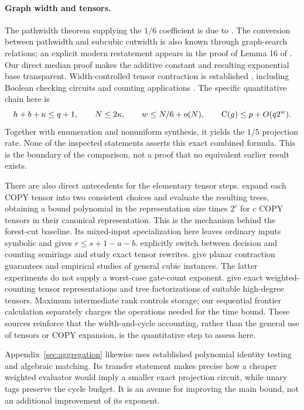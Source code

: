 \paragraph{Graph width and tensors.}
The pathwidth theorem supplying the $1/6$ coefficient is due to
\citet{FominHoie2006}. The conversion between pathwidth and subcubic
cutwidth is also known through graph-search relations; an explicit
modern restatement appears in the proof of Lemma 16 of
\citet{Bodlaender2025}. Our direct median proof makes the additive
constant and resulting exponential base transparent.
Width-controlled tensor contraction is established
\citep{MarkovShi2008}, including Boolean checking circuits and
counting applications \citep{Johnson2013}. The specific quantitative
chain here is
\[
 h+b+\kappa\le q+1,
 \qquad N\le2\kappa,
 \qquad w\le N/6+o(N),
 \qquad \mathrm{C}(g)\le p+O(q2^w).
\]
Together with enumeration and nonuniform synthesis, it yields the
$1/5$ projection rate. None of the inspected statements asserts this
exact combined formula. This is the boundary of the comparison, not
a proof that no equivalent earlier result exists.

There are also direct antecedents for the elementary tensor steps.
\citet{BiamonteMortonTurner2015} expand each COPY tensor into two
consistent choices and evaluate the resulting trees, obtaining a
bound polynomial in the representation size times $2^c$ for $c$
COPY tensors in their canonical representation. This is the mechanism
behind the forest-cut baseline. Its mixed-input specialization here
leaves ordinary inputs symbolic and gives $r\le s+1-a-b$.
\citet{BeaudrapKissingerMeichanetzidis2021} explicitly switch between
decision and counting semirings and study exact tensor rewrites.
\citet{Kourtis2019} give planar contraction guarantees and empirical
studies of general cubic instances. The latter experiments do not
supply a worst-case gate-count exponent.
\citet{DudekDuenasOsorioVardi2020} give exact weighted-counting tensor
representations and tree factorizations of suitable high-degree tensors.
Maximum intermediate rank controls storage; our sequential frontier
calculation separately charges the operations needed for the time bound.
These sources reinforce that
the width-and-cycle accounting, rather than the general use of tensors
or COPY expansion, is the quantitative step to assess here.

Appendix~\ref{sec:aggregation} likewise uses established polynomial
identity testing and algebraic matching. Its transfer statement makes
precise how a cheaper weighted evaluator would imply a smaller exact
projection circuit, while unary tags preserve the cycle budget.
It is an avenue for improving the main bound, not an additional
improvement of its exponent.

